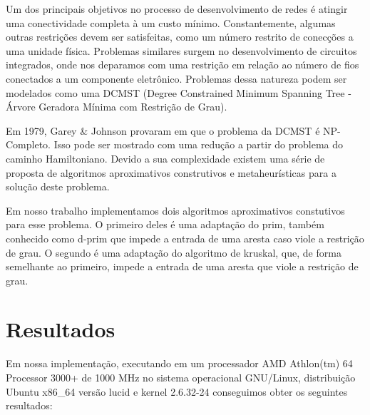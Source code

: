 \documentclass[12pt,a4paper]{article}
\begin{document}

Um dos principais objetivos no processo de desenvolvimento de redes é atingir
uma conectividade completa à um custo mínimo. Constantemente, algumas outras
restrições devem ser satisfeitas, como um número restrito de conecções a uma
unidade física. Problemas similares surgem no desenvolvimento de circuitos
integrados, onde nos deparamos com uma restrição em relação ao número de fios
conectados a um componente eletrônico. Problemas dessa natureza podem ser
modelados como uma DCMST (Degree Constrained Minimum Spanning Tree - Árvore
Geradora Mínima com Restrição de Grau)\cite{behle2007primal}.

Em 1979, Garey \& Johnson provaram em \cite{garey1979computers} que o problema
da DCMST é NP-Completo. Isso pode ser mostrado com uma redução a partir do
problema do caminho Hamiltoniano. Devido a sua complexidade existem uma série de
proposta de algoritmos aproximativos construtivos e metaheurísticas para a
solução deste problema.

Em nosso trabalho implementamos dois algoritmos aproximativos constutivos para
esse problema. O primeiro deles é uma adaptação do prim, também conhecido como
d-prim que impede a entrada de uma aresta caso viole a restrição de
grau\cite{narula1980degree}. O segundo é uma adaptação do algoritmo de kruskal,
que, de forma semelhante ao primeiro, impede a entrada de uma aresta que viole a
restrição de grau.

\section{Resultados}

Em nossa implementação, executando em um processador AMD Athlon(tm) 64 Processor
3000+ de 1000 MHz no sistema operacional GNU/Linux, distribuição Ubuntu x86\_64
versão lucid e kernel 2.6.32-24 conseguimos obter os seguintes resultados:
\end{document}
